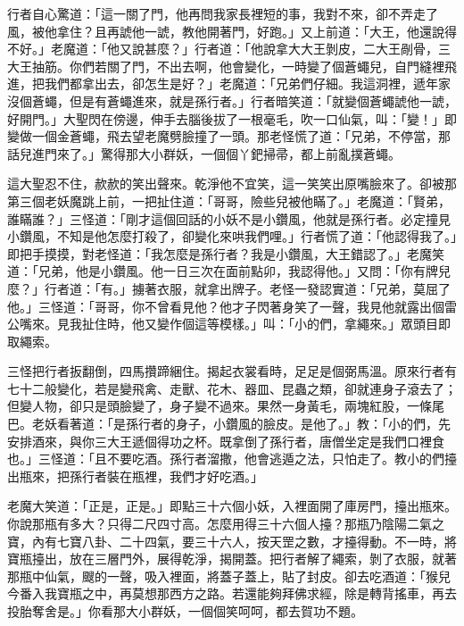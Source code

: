 行者自心驚道：「這一關了門，他再問我家長裡短的事，我對不來，卻不弄走了風，被他拿住？且再諕他一諕，教他開著門，好跑。」又上前道：「大王，他還說得不好。」老魔道：「他又說甚麼？」行者道：「他說拿大大王剝皮，二大王剮骨，三大王抽筋。你們若關了門，不出去啊，他會變化，一時變了個蒼蠅兒，自門縫裡飛進，把我們都拿出去，卻怎生是好？」老魔道：「兄弟們仔細。我這洞裡，遞年家沒個蒼蠅，但是有蒼蠅進來，就是孫行者。」行者暗笑道：「就變個蒼蠅諕他一諕，好開門。」大聖閃在傍邊，伸手去腦後拔了一根毫毛，吹一口仙氣，叫：「變！」即變做一個金蒼蠅，飛去望老魔劈臉撞了一頭。那老怪慌了道：「兄弟，不停當，那話兒進門來了。」驚得那大小群妖，一個個丫鈀掃帚，都上前亂撲蒼蠅。

這大聖忍不住，赥赥的笑出聲來。乾淨他不宜笑，這一笑笑出原嘴臉來了。卻被那第三個老妖魔跳上前，一把扯住道：「哥哥，險些兒被他瞞了。」老魔道：「賢弟，誰瞞誰？」三怪道：「剛才這個回話的小妖不是小鑽風，他就是孫行者。必定撞見小鑽風，不知是他怎麼打殺了，卻變化來哄我們哩。」行者慌了道：「他認得我了。」即把手摸摸，對老怪道：「我怎麼是孫行者？我是小鑽風，大王錯認了。」老魔笑道：「兄弟，他是小鑽風。他一日三次在面前點卯，我認得他。」又問：「你有牌兒麼？」行者道：「有。」擄著衣服，就拿出牌子。老怪一發認實道：「兄弟，莫屈了他。」三怪道：「哥哥，你不曾看見他？他才子閃著身笑了一聲，我見他就露出個雷公嘴來。見我扯住時，他又變作個這等模樣。」叫：「小的們，拿繩來。」眾頭目即取繩索。

三怪把行者扳翻倒，四馬攢蹄綑住。揭起衣裳看時，足足是個弼馬溫。原來行者有七十二般變化，若是變飛禽、走獸、花木、器皿、昆蟲之類，卻就連身子滾去了；但變人物，卻只是頭臉變了，身子變不過來。果然一身黃毛，兩塊紅股，一條尾巴。老妖看著道：「是孫行者的身子，小鑽風的臉皮。是他了。」教：「小的們，先安排酒來，與你三大王遞個得功之杯。既拿倒了孫行者，唐僧坐定是我們口裡食也。」三怪道：「且不要吃酒。孫行者溜撒，他會逃遁之法，只怕走了。教小的們擡出瓶來，把孫行者裝在瓶裡，我們才好吃酒。」

老魔大笑道：「正是，正是。」即點三十六個小妖，入裡面開了庫房門，擡出瓶來。你說那瓶有多大？只得二尺四寸高。怎麼用得三十六個人擡？那瓶乃陰陽二氣之寶，內有七寶八卦、二十四氣，要三十六人，按天罡之數，才擡得動。不一時，將寶瓶擡出，放在三層門外，展得乾淨，揭開蓋。把行者解了繩索，剝了衣服，就著那瓶中仙氣，颼的一聲，吸入裡面，將蓋子蓋上，貼了封皮。卻去吃酒道：「猴兒今番入我寶瓶之中，再莫想那西方之路。若還能夠拜佛求經，除是轉背搖車，再去投胎奪舍是。」你看那大小群妖，一個個笑呵呵，都去賀功不題。

